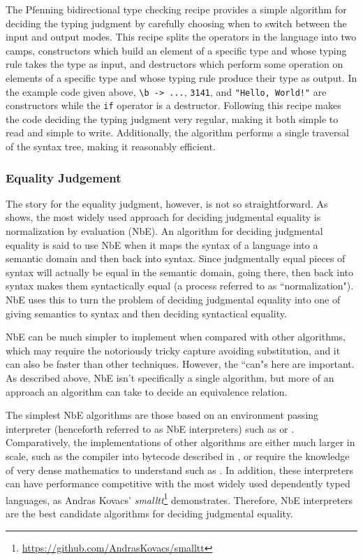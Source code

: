 \documentclass[sigplan]{acmart}
\begin{document}
The Pfenning bidirectional type checking recipe \citep{Dunfield2021} provides a simple algorithm for deciding the typing judgment by carefully choosing when to switch between the input and output modes.
This recipe splits the operators in the language into two camps, constructors which build an element of a specific type and whose typing rule takes the type as input, and destructors which perform some operation on elements of a specific type and whose typing rule produce their type as output.
In the example code given above, \verb|\b -> ...|, \verb|3141|, and \verb|"Hello, World!"| are constructors while the \verb|if| operator is a destructor.
Following this recipe makes the code deciding the typing judgment very regular, making it both simple to read and simple to write.
Additionally, the algorithm performs a single traversal of the syntax tree, making it reasonably efficient.

\subsubsection{Equality Judgement}

The story for the equality judgment, however, is not so straightforward.
As \citet{Abel2013} shows, the most widely used approach for deciding judgmental equality is normalization by evaluation (NbE).
An algorithm for deciding judgmental equality is said to use NbE when it maps the syntax of a language into a semantic domain and then back into syntax.
Since judgmentally equal pieces of syntax will actually be equal in the semantic domain, going there, then back into syntax makes them syntactically equal (a process referred to as ``normalization").
NbE uses this to turn the problem of deciding judgmental equality into one of giving semantics to syntax and then deciding syntactical equality.

NbE can be much simpler to implement when compared with other algorithms, which may require the notoriously tricky capture avoiding substitution, and it can also be faster than other techniques.
However, the ``can"s here are important.
As described above, NbE isn't specifically a single algorithm, but more of an approach an algorithm can take to decide an equivalence relation.

The simplest NbE algorithms are those based on an environment passing interpreter (henceforth referred to as NbE interpreters) such as \citet{Coquand1996} or \citet{Chapman2005}.
Comparatively, the implementations of other algorithms are either much larger in scale, such as the compiler into bytecode described in \citet{Grgoire2002}, or require the knowledge of very dense mathematics to understand such as \citet{Ahman2013}.
In addition, these interpreters can have performance competitive with the most widely used dependently typed languages, as Andras Kovacs' \textit{smalltt}\footnote{\url{https://github.com/AndrasKovacs/smalltt}} demonstrates.
Therefore, NbE interpreters are the best candidate algorithms for deciding judgmental equality.
\end{document}
